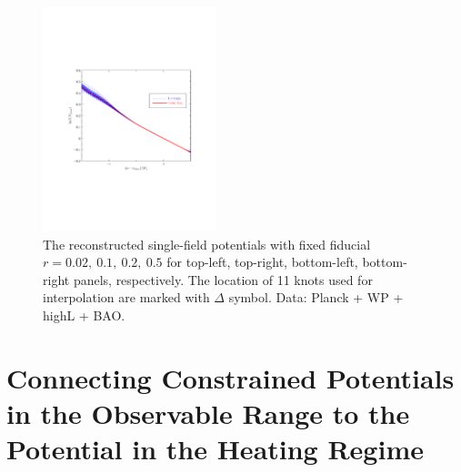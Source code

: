\documentclass[11pt]{article}
\def \halffigwidth{0.45\textwidth}
\begin{document}
\begin{figure}
  \includegraphics[width=\halffigwidth,  trim = 1in 2.9in 1in 2.9in]{nobicep_spline0_p11_r0d5_potential_traj.pdf}
  \caption{The reconstructed single-field potentials with fixed fiducial $r = 0.02,\ 0.1,\ 0.2,\ 0.5$ for top-left, top-right, bottom-left, bottom-right panels, respectively. The location of 11 knots used for interpolation are marked with $\Delta$ symbol. Data: Planck + WP + highL + BAO. \label{fig:traj_potential_fixr}}
\end{figure}


\section{Connecting Constrained Potentials in the Observable Range to the Potential in the Heating Regime }
\end{document}
